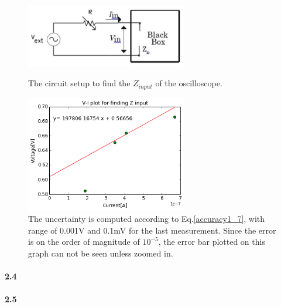 \documentclass[authoryear, 12pt,5p, times]{elsarticle}
\begin{document}
\begin{figure}[h!]
\includegraphics[width=200pt]{figure/d_Z_input}
\label{Z_input}
\caption{The circuit setup to find the $Z_{input}$ of the oscilloscope.}
\end{figure}
\begin{figure}[h!]
\includegraphics[width=200pt]{figure/Z_input_plot}
\caption{The uncertainty is computed according to Eq.\ref{accuracy1_7}, with range of 0.001V and 0.1mV for the last measurement. Since the error is on the order of magnitude of $10^{-5}$, the error bar plotted on this graph can not be seen unless zoomed in. }
\label{Z_input_plots}
\end{figure}
\paragraph{\textbf{2.4}}

\paragraph{\textbf{2.5}}
\end{document}
